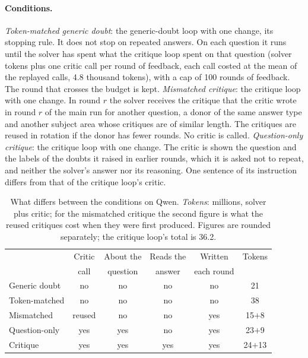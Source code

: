 \documentclass[11pt]{article}
\newcommand{\qw}{Qwen}
\begin{document}
\paragraph{Conditions.}
\emph{Token-matched generic doubt}: the generic-doubt loop with one change, its stopping rule. It does not stop on repeated answers. On each question it runs until the solver has spent what the critique loop spent on that question (solver tokens plus one critic call per round of feedback, each call costed at the mean of the replayed calls, 4.8 thousand tokens), with a cap of 100 rounds of feedback.
The round that crosses the budget is kept.
\emph{Mismatched critique}: the critique loop with one change. In round $r$ the solver receives the critique that the critic wrote in round $r$ of the main run for another question, a donor of the same answer type and another subject area whose critiques are of similar length. The critiques are reused in rotation if the donor has fewer rounds. No critic is called.
\emph{Question-only critique}: the critique loop with one change. The critic is shown the question and the labels of the doubts it raised in earlier rounds, which it is asked not to repeat, and neither the solver's answer nor its reasoning. One sentence of its instruction differs from that of the critique loop's critic.

\begin{table}[h]
\centering
\small
\setlength{\tabcolsep}{2.6pt}
\begin{tabular}{@{}l ccccc@{}}
\toprule
 & Critic & About the & Reads the & Written & Tokens \\
 & call & question & answer & each round & \\
\midrule
Generic doubt & no & no & no & no & 21 \\
Token-matched & no & no & no & no & 38 \\
Mismatched & reused & no & no & yes & 15$+$8 \\
Question-only & yes & yes & no & yes & 23$+$9 \\
Critique & yes & yes & yes & yes & 24$+$13 \\
\bottomrule
\end{tabular}
\caption{What differs between the conditions on \qw. \emph{Tokens}: millions, solver plus critic; for the mismatched critique the second figure is what the reused critiques cost when they were first produced. Figures are rounded separately; the critique loop's total is 36.2.}
\label{tab:controlprops}
\end{table}
\end{document}
